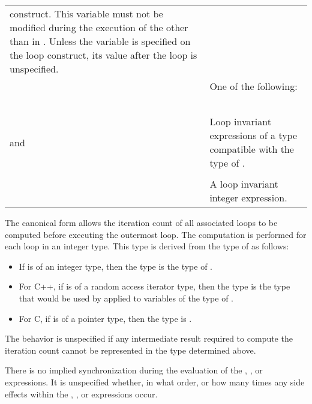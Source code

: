 \begin{supertabular}{ p{0.8in} p{4.5in}}
  construct. This variable must not be modified during the execution of the  
  other than in . Unless the variable is specified  on the
  loop construct, its value after the loop is unspecified.\\
 & One of the following:\\
 & \code{<}\\
 & \code{<=}\\
 & \code{>}\\
 & \code{>=}\\
 & \\
 and  & Loop invariant expressions of a type compatible with the type of .\\
 & \\
 & A loop invariant integer expression.\\
\end{supertabular}
\linenumbers
\medskip

\begin{figure}[t!]
\end{figure}
The canonical form allows the iteration count of all associated loops to be computed 
before executing the outermost loop. The computation is performed for each loop in an 
integer type. This type is derived from the type of  as follows:

\begin{itemize}
\item If  is of an integer type, then the type is the type of .

\item For C++, if  is of a random access iterator type, then the type is the type that 
would be used by  applied to variables of the type of .

\item For C, if  is of a pointer type, then the type is .
\end{itemize}

The behavior is unspecified if any intermediate result required to compute the iteration 
count cannot be represented in the type determined above.

There is no implied synchronization during the evaluation of the , , or  
expressions. It is unspecified whether, in what order, or how many times any side effects 
within the , , or  expressions occur.

